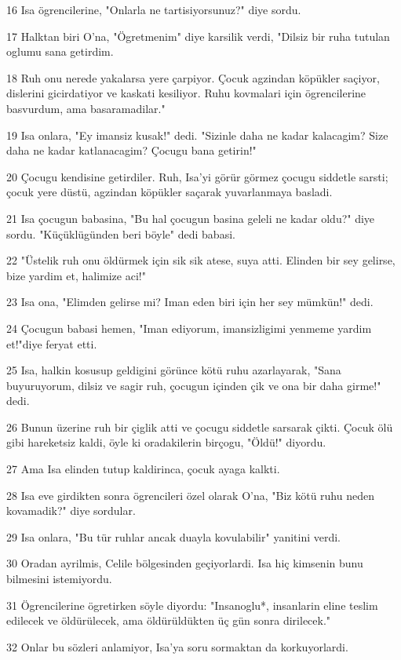 \par 16 Isa ögrencilerine, "Onlarla ne tartisiyorsunuz?" diye sordu.
\par 17 Halktan biri O'na, "Ögretmenim" diye karsilik verdi, "Dilsiz bir ruha tutulan oglumu sana getirdim.
\par 18 Ruh onu nerede yakalarsa yere çarpiyor. Çocuk agzindan köpükler saçiyor, dislerini gicirdatiyor ve kaskati kesiliyor. Ruhu kovmalari için ögrencilerine basvurdum, ama basaramadilar."
\par 19 Isa onlara, "Ey imansiz kusak!" dedi. "Sizinle daha ne kadar kalacagim? Size daha ne kadar katlanacagim? Çocugu bana getirin!"
\par 20 Çocugu kendisine getirdiler. Ruh, Isa'yi görür görmez çocugu siddetle sarsti; çocuk yere düstü, agzindan köpükler saçarak yuvarlanmaya basladi.
\par 21 Isa çocugun babasina, "Bu hal çocugun basina geleli ne kadar oldu?" diye sordu. "Küçüklügünden beri böyle" dedi babasi.
\par 22 "Üstelik ruh onu öldürmek için sik sik atese, suya atti. Elinden bir sey gelirse, bize yardim et, halimize aci!"
\par 23 Isa ona, "Elimden gelirse mi? Iman eden biri için her sey mümkün!" dedi.
\par 24 Çocugun babasi hemen, "Iman ediyorum, imansizligimi yenmeme yardim et!"diye feryat etti.
\par 25 Isa, halkin kosusup geldigini görünce kötü ruhu azarlayarak, "Sana buyuruyorum, dilsiz ve sagir ruh, çocugun içinden çik ve ona bir daha girme!" dedi.
\par 26 Bunun üzerine ruh bir çiglik atti ve çocugu siddetle sarsarak çikti. Çocuk ölü gibi hareketsiz kaldi, öyle ki oradakilerin birçogu, "Öldü!" diyordu.
\par 27 Ama Isa elinden tutup kaldirinca, çocuk ayaga kalkti.
\par 28 Isa eve girdikten sonra ögrencileri özel olarak O'na, "Biz kötü ruhu neden kovamadik?" diye sordular.
\par 29 Isa onlara, "Bu tür ruhlar ancak duayla kovulabilir" yanitini verdi.
\par 30 Oradan ayrilmis, Celile bölgesinden geçiyorlardi. Isa hiç kimsenin bunu bilmesini istemiyordu.
\par 31 Ögrencilerine ögretirken söyle diyordu: "Insanoglu*, insanlarin eline teslim edilecek ve öldürülecek, ama öldürüldükten üç gün sonra dirilecek."
\par 32 Onlar bu sözleri anlamiyor, Isa'ya soru sormaktan da korkuyorlardi.
